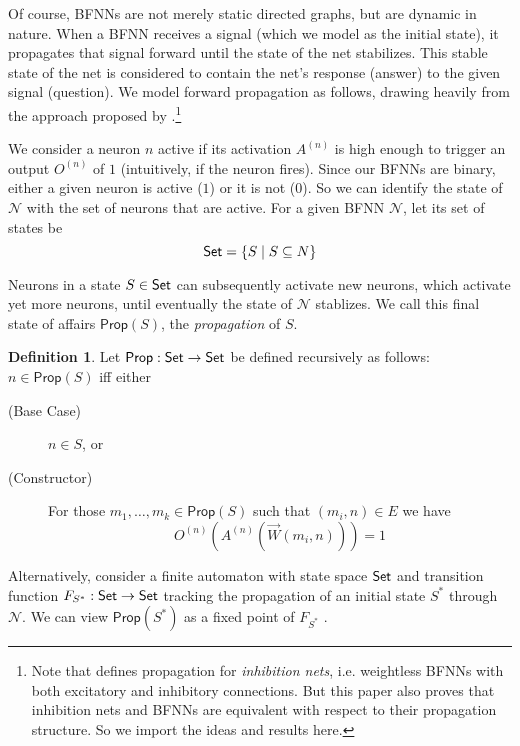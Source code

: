 \documentclass[letterpaper]{article}
\theoremstyle{definition}
\newtheorem{definition}{Definition}
\newcommand{\Set}{\mbox{\sf Set}}
\newcommand{\set}[1]{\{ #1 \}}
\newcommand{\Prop}{\textsf{Prop}}
\newcommand{\Net}{\mathcal{N}}
\begin{document}
Of course, BFNNs are not merely static directed graphs, but are dynamic in nature.  When a BFNN receives a signal (which we model as the initial state), it propagates that signal forward until the state of the net stabilizes.  This stable state of the net is considered to contain the net's response (answer) to the given signal (question).  We model forward propagation as follows, drawing heavily from the approach proposed by \citep{leitgeb2001nonmonotonic}.\footnote{Note that \citep{leitgeb2001nonmonotonic} defines propagation for \emph{inhibition nets}, i.e. weightless BFNNs with both excitatory and inhibitory connections.  But this paper also proves that inhibition nets and BFNNs are equivalent with respect to their propagation structure.   So we import the ideas and results here.}  

We consider a neuron $n$ active if its activation $A^{(n)}$ is high enough to trigger an output $O^{(n)}$ of $1$ (intuitively, if the neuron fires).  Since our BFNNs are binary, either a given neuron is active ($1$) or it is not ($0$).  So we can identify the state of $\Net$ with the set of neurons that are active.  For a given BFNN $\Net$, let its set of states be
\[
    \Set = \set{S \mid S \subseteq N}
\]

Neurons in a state $S \in \Set$ can subsequently activate new neurons, which activate yet more neurons, until eventually the state of $\Net$ stablizes.  We call this final state of affairs $\Prop(S)$, the \emph{propagation} of $S$.

\begin{definition}
Let $\Prop : \Set \to \Set$ be defined recursively as follows:  $n \in \Prop(S)$ iff either
\begin{description}
    \item[(Base Case)] $n \in S$, or
    \item[(Constructor)] For those $m_1, \ldots, m_k \in \Prop(S)$ such that $(m_i, n) \in E$ we have
    \[
    O^{(n)}(A^{(n)}(\overrightarrow{W}(m_i, n))) = 1
    \]
\end{description}
\end{definition}

Alternatively, consider a finite automaton with state space $\Set$ and transition function $F_{S^\ast} : \Set \to \Set$ tracking the propagation of an initial state $S^\ast$ through $\Net$.  We can view $\Prop(S^\ast)$ as a fixed point of $F_{S^\ast}$ \citep{leitgeb2001nonmonotonic}.
\end{document}
